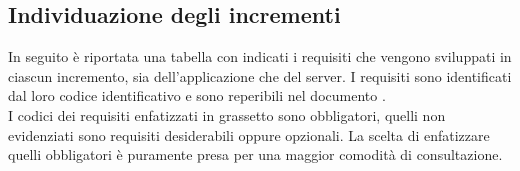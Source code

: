 \subsection{Individuazione degli incrementi}
In seguito è riportata una tabella con indicati i requisiti che vengono sviluppati in ciascun incremento, sia dell'applicazione che del server.
I requisiti sono identificati dal loro codice identificativo e sono reperibili nel documento \AdR{}.\\
I codici dei requisiti enfatizzati in grassetto sono obbligatori, quelli non evidenziati sono requisiti desiderabili oppure opzionali.
La scelta di enfatizzare quelli obbligatori è puramente presa per una maggior comodità di consultazione.

